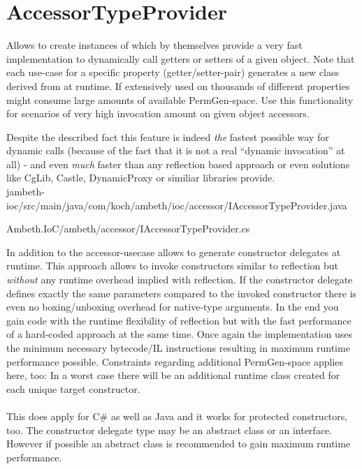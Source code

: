 \section{AccessorTypeProvider}
\label{feature:AccessorTypeProvider}
\ClearAPI
Allows to create instances of  which by themselves provide a very fast implementation to dynamically call getters or setters of a given object. Note that each use-case for a specific property (getter/setter-pair) generates a new class derived from  at runtime. If extensively used on thousands of different properties might consume large amounts of available PermGen-space. Use this functionality for scenarios of very high invocation amount on given object accessors.

Despite the described fact this feature is indeed \emph{the} fastest possible way for dynamic calls (because of the fact that it is not a real ``dynamic invocation'' at all) - and even \emph{much} faster than any reflection based approach or even solutions like CgLib, Castle, DynamicProxy or similiar libraries provide.\\

{jambeth-ioc/src/main/java/com/koch/ambeth/ioc/accessor/IAccessorTypeProvider.java}

{Ambeth.IoC/ambeth/accessor/IAccessorTypeProvider.cs}

In addition to the accessor-usecase  allows to generate constructor delegates at runtime. This approach allows to invoke constructors similar to reflection but \emph{without} any runtime overhead implied with reflection. If the constructor delegate defines exactly the same parameters compared to the invoked constructor there is even no boxing/unboxing overhead for native-type arguments. In the end you gain code with the runtime flexibility of reflection but with the fast performance of a hard-coded approach at the same time. Once again the implementation uses the minimum necessary bytecode/IL instructions resulting in maximum runtime performance possible. Constraints regarding additional PermGen-space applies here, too: In a worst case there will be an additional runtime class created for each unique target constructor.\\\\

This does apply for C\# as well as Java and it works for protected constructors, too. The constructor delegate type may be an abstract class or an interface. However if possible an abstract class is recommended to gain maximum runtime performance.

